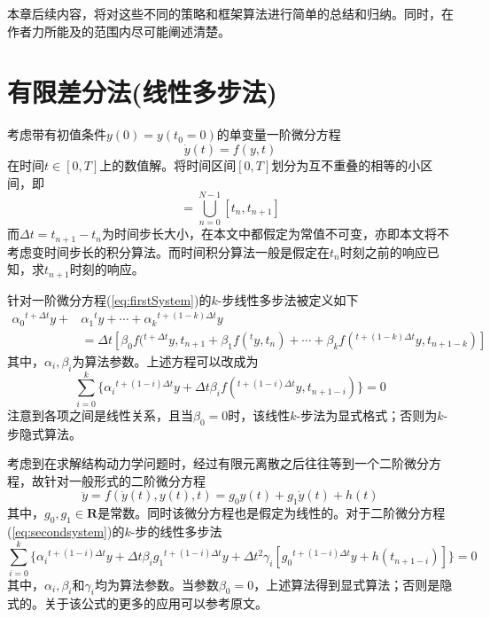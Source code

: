 本章后续内容，将对这些不同的策略和框架算法进行简单的总结和归纳。同时，在作者力所能及的范围内尽可能阐述清楚。
\section{有限差分法(线性多步法)}
考虑带有初值条件$y(0)=y(t_0=0)$的单变量一阶微分方程
\begin{equation}
\dot{y}(t)=f(y,t)\label{eq:firstSystem}
\end{equation}
在时间$t\in[0,T]$上的数值解。将时间区间$[0,T]$划分为互不重叠的相等的小区间，即
\begin{equation}
[0,T]=\bigcup_{n=0}^{N-1}[t_n,t_{n+1}]
\end{equation}
而$\Delta t=t_{n+1}-t_n$为时间步长大小，在本文中都假定为常值不可变，亦即本文将不考虑变时间步长的积分算法。而时间积分算法一般是假定在$t_n$时刻之前的响应已知，求$t_{n+1}$时刻的响应。

针对一阶微分方程(\ref{eq:firstSystem})的$k$-步线性多步法\cite{book:dover,Gear1971a}被定义如下
\begin{equation}
\begin{split}
\alpha_0{^{t+\Delta t}\!y}+&\alpha_1{^{t}\!y}+\cdots+\alpha_k{^{t+(1-k)\Delta t}\!y}\\
&=\Delta t[\beta_0f({^{t+\Delta t}\!y},t_{n+1}+\beta_1f({^{t}\!y},t_{n})+\cdots+\beta_kf({^{t+(1-k)\Delta t}\!y},t_{n+1-k})]
\end{split}
\end{equation}
其中，$\alpha_i,\beta_i$为算法参数。上述方程可以改成为
\begin{equation}
\sum_{i=0}^k\{\alpha_i{^{t+(1-i)\Delta t}\!y}+\Delta t\beta_if({^{t+(1-i)\Delta t}\!y},t_{n+1-i}) \}=0\label{eq:firstsystemLMS}
\end{equation}
注意到各项之间是线性关系，且当$\beta_0=0$时，该线性$k$-步法为显式格式；否则为$k$-步隐式算法。

考虑到在求解结构动力学问题时，经过有限元离散之后往往等到一个二阶微分方程，故针对一般形式的二阶微分方程
\begin{equation}
\ddot{y}=f(\dot{y}(t),y(t),t)=g_0y(t)+g_1\dot{y}(t)+h(t)\label{eq:secondsystem}
\end{equation}
其中，$g_0,g_1\in\mathbf{R}$是常数。同时该微分方程也是假定为线性的。对于二阶微分方程(\ref{eq:secondsystem})的$k$-步的线性多步法\cite{Geradin2006}
\begin{equation}
\sum_{i=0}^{k}\{\alpha_i{^{t+(1-i)\Delta t}\!y}+\Delta t\beta_ig_1{^{t+(1-i)\Delta t}\!y}+\Delta t^2\gamma_i[g_0{^{t+(1-i)\Delta t}\!y}+h(t_{n+1-i})]\}=0
\end{equation}
其中，$\alpha_i,\beta_i$和$\gamma_i$均为算法参数。当参数$\beta_0=0$，上述算法得到显式算法；否则是隐式的。关于该公式的更多的应用可以参考原文。
